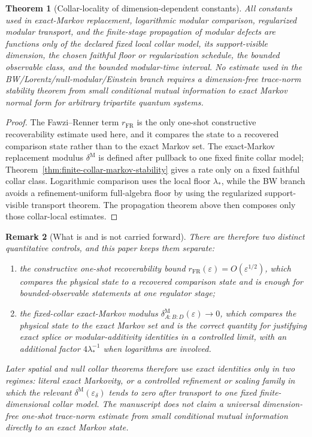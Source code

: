 \documentclass[11pt]{article}
\newtheorem{theorem}{Theorem}[section]
\newtheorem{remark}[theorem]{Remark}
\begin{document}
\begin{theorem}[Collar-locality of dimension-dependent constants]\label{thm:dimension-quarantine}
All constants used in exact-Markov replacement, logarithmic modular
comparison, regularized modular transport, and the finite-stage propagation of
modular defects are functions only of the declared fixed local collar model,
its support-visible dimension, the chosen faithful floor or regularization
schedule, the bounded observable class, and the bounded modular-time interval.
No estimate used in the BW/Lorentz/null-modular/Einstein branch requires a
dimension-free trace-norm stability theorem from small conditional mutual
information to exact Markov normal form for arbitrary tripartite quantum
systems.
\end{theorem}

\begin{proof}
The Fawzi--Renner term \(r_{\mathrm{FR}}\) is the only one-shot constructive
recoverability estimate used here, and it compares the state to a recovered
comparison state rather than to the exact Markov set. The exact-Markov
replacement modulus \(\delta^{\mathrm M}\) is defined after pullback to one
fixed finite collar model; Theorem~\ref{thm:finite-collar-markov-stability}
gives a rate only on a fixed faithful collar class. Logarithmic comparison uses
the local floor \(\lambda_\ast\), while the BW branch avoids a refinement-uniform
full-algebra floor by using the regularized support-visible transport theorem.
The propagation theorem above then composes only those collar-local estimates.
\end{proof}

\begin{remark}[What is and is not carried forward]
There are therefore two distinct quantitative controls, and this paper keeps them separate:
\begin{enumerate}[leftmargin=2em]
\item the constructive one-shot recoverability bound \(r_{\mathrm{FR}}(\varepsilon)=O(\varepsilon^{1/2})\), which compares the physical state to a recovered comparison state and is enough for bounded-observable statements at one regulator stage;
\item the fixed-collar exact-Markov modulus \(\delta^{\mathrm M}_{A:B:D}(\varepsilon)\to 0\), which compares the physical state to the exact Markov set and is the correct quantity for justifying exact splice or modular-additivity identities in a controlled limit, with an additional factor \(4\lambda_\ast^{-1}\) when logarithms are involved.
\end{enumerate}
Later spatial and null collar theorems therefore use exact identities only in two regimes: literal exact Markovity, or a controlled refinement or scaling family in which the relevant \(\delta^{\mathrm M}(\varepsilon_\delta)\) tends to zero after transport to one fixed finite-dimensional collar model. The manuscript does \emph{not} claim a universal dimension-free one-shot trace-norm estimate from small conditional mutual information directly to an exact Markov state.
\end{remark}
\end{document}

